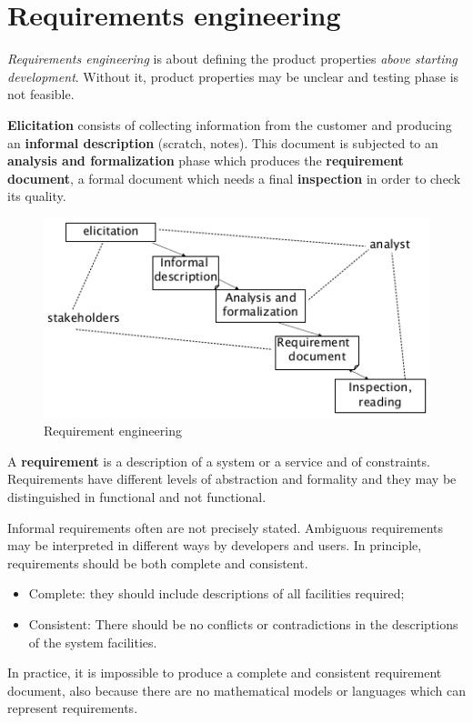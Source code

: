 \chapter{Requirements engineering}
\emph{Requirements engineering} is about defining the product properties \textit{above starting development}. Without it, product properties may be unclear and testing phase is not feasible.

\textbf{Elicitation} consists of collecting information from the customer and producing an \textbf{informal description} (scratch, notes). This document is subjected to an \textbf{analysis and formalization} phase which produces the \textbf{requirement document}, a formal document which needs a final \textbf{inspection} in order to check its quality.

\begin{figure}[hbtp]
\centering
\includegraphics[scale=0.4]{images/re_phases.png}
\caption{Requirement engineering}
\end{figure}

A \textbf{requirement} is a description of a system or a service and of constraints. Requirements have different levels of abstraction and formality and they may be distinguished in functional and not functional.

Informal requirements often are not precisely stated. Ambiguous requirements may be interpreted in different ways by developers and users. In principle, requirements should be both complete and consistent.
\begin{itemize}
\item Complete: they should include descriptions of all facilities required;
\item Consistent: There should be no conflicts or contradictions in the descriptions of the system facilities.
\end{itemize}
In practice, it is impossible to produce a complete and consistent requirement document, also because there are no mathematical models or languages which can represent requirements.

